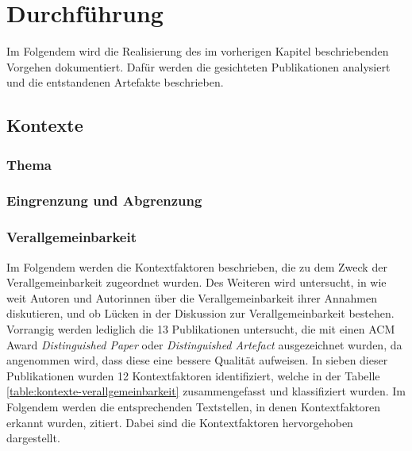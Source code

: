 \chapter{Durchführung}
\label{chapter:impl}
Im Folgendem wird die Realisierung des im vorherigen Kapitel beschriebenden Vorgehen dokumentiert. Dafür werden  die gesichteten Publikationen analysiert und die entstandenen Artefakte beschrieben. 

\section{Kontexte}

\subsection{Thema}

\subsection{Eingrenzung und Abgrenzung}

\clearpage
\subsection{Verallgemeinbarkeit}

Im Folgendem werden die Kontextfaktoren beschrieben, die zu dem Zweck der Verallgemeinbarkeit zugeordnet wurden. Des Weiteren wird untersucht, in wie weit Autoren und Autorinnen über die Verallgemeinbarkeit ihrer Annahmen diskutieren, und ob Lücken in der Diskussion zur Verallgemeinbarkeit bestehen. \\

Vorrangig werden lediglich die 13 Publikationen untersucht, die mit einen ACM Award \textit{Distinguished Paper} oder \textit{Distinguished Artefact} ausgezeichnet wurden, da angenommen wird, dass diese eine bessere Qualität aufweisen. In sieben dieser Publikationen wurden 12 Kontextfaktoren identifiziert, welche in der Tabelle \ref{table:kontexte-verallgemeinbarkeit} zusammengefasst und klassifiziert wurden. Im Folgendem werden die entsprechenden Textstellen, in denen Kontextfaktoren erkannt wurden, zitiert. Dabei sind die Kontextfaktoren hervorgehoben dargestellt. \\

